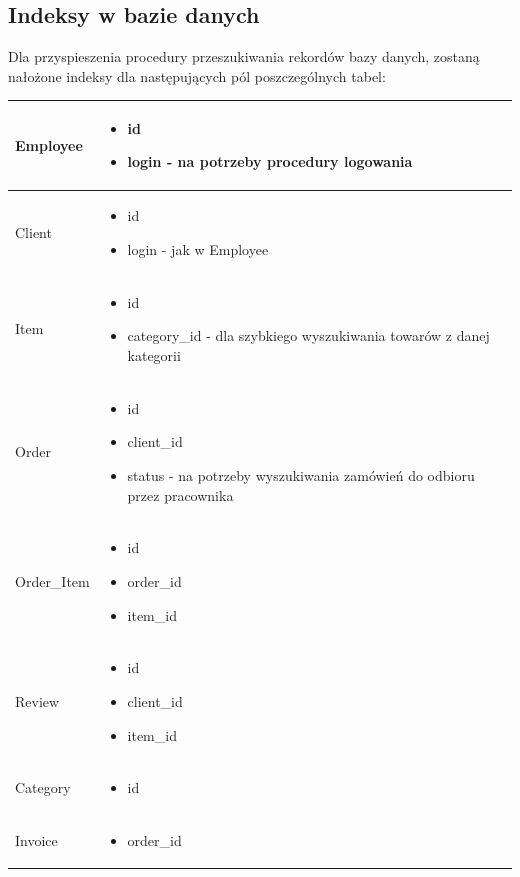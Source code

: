 \documentclass[10pt,a4paper]{article}
\begin{document}
		\subsection{Indeksy w bazie danych}
  		Dla przyspieszenia procedury przeszukiwania rekordów bazy danych,
  		zostaną nałożone indeksy dla następujących pól poszczególnych tabel:
  		
  		\flushleft
  		\begin{longtable}{| m{3cm} | m{9cm} |}
	    \hline
  Employee &  \begin{itemize}
  			  \item id
			  \item login - na potrzeby procedury logowania
			  \end{itemize}\\ \hline
  Client   &  \begin{itemize}
	    	  \item	id
    		  \item login - jak w Employee
			  \end{itemize}\\ \hline
  Item     &  \begin{itemize}
      		  \item id
    		  \item category\_id - dla szybkiego wyszukiwania towarów z danej kategorii
			  \end{itemize}\\ \hline
  Order    &  \begin{itemize}
      		  \item id
    		  \item client\_id
    		  \item status - na potrzeby wyszukiwania zamówień do odbioru przez pracownika
			  \end{itemize}\\ \hline
Order\_Item&  \begin{itemize}
	          \item id
	          \item order\_id
	          \item item\_id
			  \end{itemize}\\ \hline
Review	   &  \begin{itemize}
   			  \item id
   			  \item client\_id
   			  \item item\_id
			  \end{itemize}\\ \hline
Category   &  \begin{itemize}
		      \item id
			  \end{itemize}\\ \hline
Invoice	   &  \begin{itemize}
		      \item order\_id
			  \end{itemize}\\ \hline
  
   		\end{longtable}
   		
\end{document}
